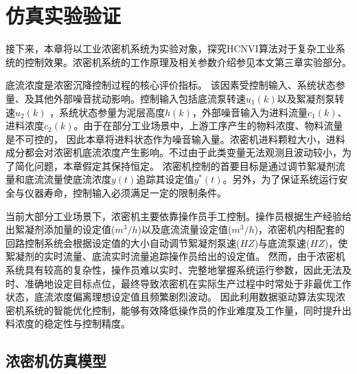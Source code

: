\section{仿真实验验证}
\label{sec:experiment}
接下来，本章将以工业浓密机系统为实验对象，探究HCNVI算法对于复杂工业系统的控制效果。浓密机系统的工作原理及相关参数介绍参见本文第三章实验部分。

底流浓度是浓密沉降控制过程的核心评价指标。
该因素受控制输入、系统状态参量、及其他外部噪音扰动影响。控制输入包括底流泵转速$u_1(k)$以及絮凝剂泵转速$u_2(k)$
，系统状态参量为泥层高度$h(k)$，外部噪音输入为进料流量$c_1(k)$、进料浓度$c_2(k)$。由于在部分工业场景中，上游工序产生的物料浓度、物料流量是不可控的，
因此本章将进料状态作为噪音输入量。浓密机进料颗粒大小，进料成分都会对浓密机底流浓度产生影响。不过由于此类变量无法观测且波动较小，为了简化问题，本章假定其保持恒定。
浓密机控制的首要目标是通过调节絮凝剂流量和底流流量使底流浓度$y(t)$追踪其设定值$y^*(t)$。另外，为了保证系统运行安全与仪器寿命，控制输入必须满足一定的限制条件。

当前大部分工业场景下，浓密机主要依靠操作员手工控制。操作员根据生产经验给出絮凝剂添加量的设定值($m^3/h$)以及底流流量设定值($m^3/h$)，浓密机内相配套的回路控制系统会根据设定值的大小自动调节絮凝剂泵速($HZ$)与底流泵速($HZ$)，使絮凝剂的实时流量、底流实时流量追踪操作员给出的设定值。
然而，由于浓密机系统具有较高的复杂性，操作员难以实时、完整地掌握系统运行参数，因此无法及时、准确地设定目标点位，最终导致浓密机在实际生产过程中时常处于非最优工作状态，底流浓度偏离理想设定值且频繁剧烈波动。
因此利用数据驱动算法实现浓密机系统的智能优化控制，能够有效降低操作员的作业难度及工作量，同时提升出料浓度的稳定性与控制精度。

\subsection{浓密机仿真模型}


